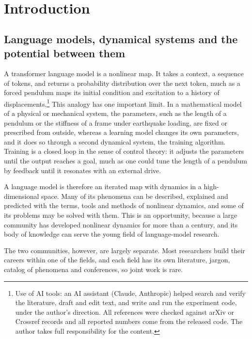 \section{Introduction}
\label{sec:intro}



\subsection{Language models, dynamical systems and the potential between them}
\label{sec:potential}

A transformer language model is a nonlinear map. It takes a context, a sequence of tokens, and returns a probability distribution over the next token, much as a forced pendulum maps its initial condition and excitation to a history of displacements.\footnote{Use of AI tools: an AI assistant (Claude, Anthropic) helped search and verify the literature, draft and edit text, and write and run the experiment code, under the author's direction. All references were checked against arXiv or Crossref records and all reported numbers come from the released code. The author takes full responsibility for the content.} This analogy has one important limit. In a mathematical model of a physical or mechanical system, the parameters, such as the length of a pendulum or the stiffness of a frame under earthquake loading, are fixed or prescribed from outside, whereas a learning model changes its own parameters, and it does so through a second dynamical system, the training algorithm. Training is a closed loop in the sense of control theory: it adjusts the parameters until the output reaches a goal, much as one could tune the length of a pendulum by feedback until it resonates with an external drive.

A language model is therefore an iterated map with dynamics in a high-dimensional space. Many of its phenomena can be described, explained and predicted with the terms, tools and methods of nonlinear dynamics, and some of its problems may be solved with them. This is an opportunity, because a large community has developed nonlinear dynamics for more than a century, and its body of knowledge can serve the young field of language-model research.

The two communities, however, are largely separate. Most researchers build their careers within one of the fields, and each field has its own literature, jargon, catalog of phenomena and conferences, so joint work is rare.

